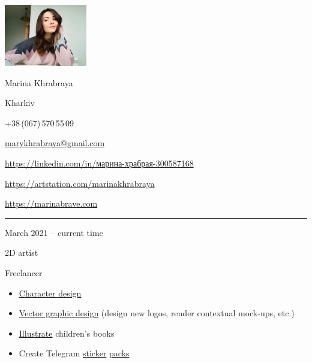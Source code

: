 \documentclass[a4paper,10pt]{article}
\newlength{\cvcolumngapwidth}
\newlength{\cvleftcolumnwidth}
\newlength{\cvrightcolumnwidth}
\newcommand{\cvnamestyle}[1]{{\Large\cvnamefont\textcolor{cvnamecolor}{#1}}}
\newcommand{\cvsectionstyle}[1]{{\normalsize\cvsectionfont\textcolor{cvsectioncolor}{#1}}}
\newcommand{\cvtitlestyle}[1]{{\large\cvtitlefont\textcolor{cvtitlecolor}{#1}}}
\newcommand{\cvdurationstyle}[1]{{\small\cvdurationfont\textcolor{cvdurationcolor}{#1}}}
\newlength{\cvafteritemskipamount}
\newlength{\cvaftersectionskipamount}
\newlength{\cvafternameskipamount}
\newlength{\cvafterpersonalinfolineskipamount}
\newlength{\cvaftertitleskipamount}
\newlength{\cvparskip}
\newcommand{\cvpersonalinfo}[2]{
\begin{minipage}[t]{\cvleftcolumnwidth}
    \vspace{0mm} %
    \raggedleft #1
\end{minipage}%
\hspace{\cvcolumngapwidth}%
\begin{minipage}[t]{\cvrightcolumnwidth}
    \vspace{0mm} %
    #2
\end{minipage}

\vspace{\cvafteritemskipamount}
}
\newcommand{\cvname}[1]{
\cvnamestyle{#1}

\vspace{\cvafternameskipamount}
}
\newcommand{\cvpersonalinfolinewithicon}[3]{
\raisebox{.5\fontcharht\font`E-.5\height}{\texttt{[image: \#2]}}
#3

\vspace{\cvafterpersonalinfolineskipamount}
}
\newcommand{\cvsection}[1]{
\begin{minipage}[t]{\cvleftcolumnwidth}
    \raggedleft\cvsectionstyle{#1}
\end{minipage}%
\hspace{\cvcolumngapwidth}%
\begin{minipage}[t]{\cvrightcolumnwidth}
    \textcolor{cvrulecolor}{\rule{\cvrightcolumnwidth}{0.3mm}}
\end{minipage}

\vspace{\cvaftersectionskipamount}
}
\newcommand{\cvitem}[2]{
\begin{minipage}[t]{\cvleftcolumnwidth}
    \raggedleft #1
\end{minipage}%
\hspace{\cvcolumngapwidth}%
\begin{minipage}[t]{\cvrightcolumnwidth}
    \setlength{\parskip}{\cvparskip} #2
\end{minipage}

\vspace{\cvafteritemskipamount}
}
\newcommand{\cvtitle}[1]{
\cvtitlestyle{#1}

\vspace{\cvaftertitleskipamount}
\vspace{-\cvparskip}
}
\begin{document}
\hypersetup{
    linkcolor=blue,
    filecolor=magenta,
    urlcolor=cyan,
}



\cvpersonalinfo{
\includegraphics[trim={36cm 20cm 25cm 0cm},clip,width=36mm]{resources/photo.jpg}
}{
\cvname{Marina Khrabraya}

\cvpersonalinfolinewithicon{height=4mm}{resources/IcoMoon-Free-PDF/072-location.pdf}{
Kharkiv
}

\cvpersonalinfolinewithicon{height=4mm}{resources/IcoMoon-Free-PDF/067-phone.pdf}{
+38\,(067)\,570\,55\,09
}

\cvpersonalinfolinewithicon{height=4mm}{resources/IcoMoon-Free-PDF/070-envelop.pdf}{
\href{mailto://marykhrabraya@gmail.com}{marykhrabraya@gmail.com}
}

\cvpersonalinfolinewithicon{height=4mm}{resources/IcoMoon-Free-PDF/458-linkedin.pdf}{
\href{https://www.linkedin.com/in/\%D0\%BC\%D0\%B0\%D1\%80\%D0\%B8\%D0\%BD\%D0\%B0-\%D1\%85\%D1\%80\%D0\%B0\%D0\%B1\%D1\%80\%D0\%B0\%D1\%8F-300587168/}{https://linkedin.com/in/марина-храбрая-300587168}
}

\cvpersonalinfolinewithicon{height=4mm}{"resources/ArtStationLogo/vector/ArtStation-logomark-dark.eps"}{
\href{https://artstation.com/marinakhrabraya}{https://artstation.com/marinakhrabraya}
}

\cvpersonalinfolinewithicon{height=4mm}{resources/IcoMoon-Free-PDF/203-earth.pdf}{
\href{https://marinabrave.com}{https://marinabrave.com}
}
}



\cvsection{WORK EXPERIENCE}

\cvitem{
\cvdurationstyle{March 2021 -- current time}
}{
\cvtitle{2D artist}

Freelancer

\begin{itemize}[leftmargin=*]
    \item \href{https://www.artstation.com/artwork/rAG99J}{Character design}
    \item \href{https://www.artstation.com/artwork/J9m9ez}{Vector graphic design} (design new logos, render contextual mock-ups, etc.)
    \item \href{https://www.artstation.com/artwork/5X3PWz}{Illustrate} children's books
    \item Create Telegram \href{https://t.me/addstickers/Nixraccoon}{sticker} \href{https://t.me/addstickers/Mam_rental}{packs}
\end{itemize}
}
\end{document}
